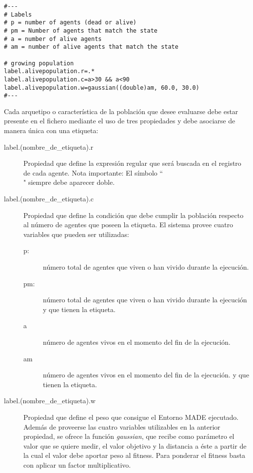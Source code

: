 \begin{verbatim}
#---
# Labels
# p = number of agents (dead or alive)
# pm = Number of agents that match the state
# a = number of alive agents
# am = number of alive agents that match the state

# growing population
label.alivepopulation.r=.*
label.alivepopulation.c=a>30 && a<90
label.alivepopulation.w=gaussian((double)am, 60.0, 30.0)
#---
\end{verbatim}

Cada arquetipo o característica de la población que desee evaluarse debe estar
presente en el fichero mediante el uso de tres propiedades y debe asociarse de
manera única con una etiqueta:

\begin{description}
 \item[label.(nombre\_de\_etiqueta).r] Propiedad que define la expresión regular
que será buscada en el registro de cada agente. Nota importante: El símbolo
``\\" siempre debe aparecer doble.
 \item[label.(nombre\_de\_etiqueta).c] Propiedad que define la condición
que debe cumplir la población respecto al número de agentes que poseen la
etiqueta. El sistema provee cuatro variables que pueden ser utilizadas:
\begin{description}
 \item[p:] número total de agentes que viven o han vivido durante la ejecución.
 \item[pm:]  número total de agentes que viven o han vivido durante la
ejecución y que tienen la etiqueta.
 \item[a] número de agentes vivos en el momento del fin de la ejecución.
 \item[am] número de agentes  vivos en el momento del fin de la ejecución. y
que tienen la etiqueta.
\end{description}
 \item[label.(nombre\_de\_etiqueta).w] Propiedad que define el peso que consigue
el Entorno MADE ejecutado. Además de proveerse las cuatro variables utilizables
en la anterior propiedad, se ofrece la función \textit{gaussian}, que recibe
como parámetro el valor que se quiere medir, el valor objetivo y la distancia a
éste a partir de la cual el valor debe aportar peso al fitness. Para ponderar
el fitness basta con aplicar un factor multiplicativo.
\end{description}





